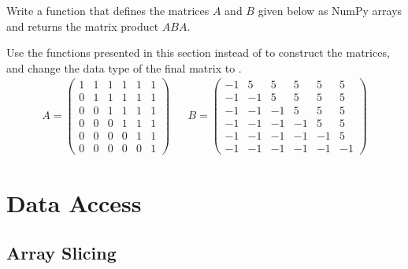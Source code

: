 \begin{problem} %
Write a function that defines the matrices $A$ and $B$ given below as NumPy arrays and returns the matrix product $ABA$.

Use the functions presented in this section instead of  to construct the matrices, and change the data type of the final matrix to .
\begin{align*}
A = \left(\begin{array}{rrrrrr}
1 & 1 & 1 & 1 & 1 & 1\\
0 & 1 & 1 & 1 & 1 & 1\\
0 & 0 & 1 & 1 & 1 & 1\\
0 & 0 & 0 & 1 & 1 & 1\\
0 & 0 & 0 & 0 & 1 & 1\\
0 & 0 & 0 & 0 & 0 & 1\end{array}\right)
&&
B = \left(\begin{array}{rrrrrr}
-1 &  5 &  5 &  5 &  5 &  5\\
-1 & -1 &  5 &  5 &  5 &  5\\
-1 & -1 & -1 &  5 &  5 &  5\\
-1 & -1 & -1 & -1 &  5 &  5\\
-1 & -1 & -1 & -1 & -1 &  5\\
-1 & -1 & -1 & -1 & -1 & -1\end{array}\right)
\end{align*}
\label{prob:simple3}
\end{problem}


\section*{Data Access} %

\subsection*{Array Slicing} %


